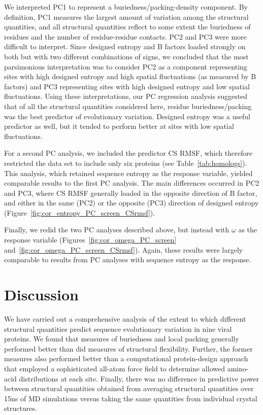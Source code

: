 \documentclass[smallextended]{svjour3}
\begin{document}
We interpreted PC1 to represent a buriedness/packing-density component. By definition, PC1 measures the largest amount of variation among the structural quantities, and all structural quantities reflect to some extent the buriedness of residues and the number of residue-residue contacts. PC2 and PC3 were more difficult to interpret. Since designed entropy and B factors loaded strongly on both but with two different combinations of signs, we concluded that the most parsimonious interpretation was to consider PC2 as a component representing sites with high designed entropy and high spatial fluctuations (as measured by B factors) and PC3 representing sites with high designed entropy and low spatial fluctuations. Using these interpretations, our PC regression analysis suggested that of all the structural quantities considered here, residue buriedness/packing was the best predictor of evolutionary variation. Designed entropy was a useful predictor as well, but it tended to perform better at sites with low spatial fluctuations.

For a second PC analysis, we included the predictor CS RMSF, which therefore restricted the data set to include only six proteins (see Table~\ref{tab:homologs}). This analysis, which retained sequence entropy as the response variable, yielded comparable results to the first PC analysis. The main differences occurred in PC2 and PC3, where CS RMSF generally loaded in the opposite direction of B factor, and either in the same (PC2) or the opposite (PC3) direction of designed entropy (Figure~\ref{fig:cor_entropy_PC_screen_CSrmsf}). 

Finally, we redid the two PC analyses described above, but instead with $\omega$ as the response variable (Figures~\ref{fig:cor_omega_PC_screen} and~\ref{fig:cor_omega_PC_screen_CSrmsf}). Again, these results were largely comparable to results from PC analyses with sequence entropy as the response.

\section*{Discussion}

We have carried out a comprehensive analysis of the extent to which different structural quantities predict sequence evolutionary variation in nine viral proteins. We found that measures of buriedness and local packing generally performed better than did measures of structural flexibility. Further, the former measures also performed better than a computational protein-design approach that employed a sophisticated all-atom force field to determine allowed amino-acid distributions at each site. Finally, there was no difference in predictive power between structural quantities obtained from averaging structural quantities over 15ns of MD simulations versus taking the same quantities from individual crystal structures. 
\end{document}
